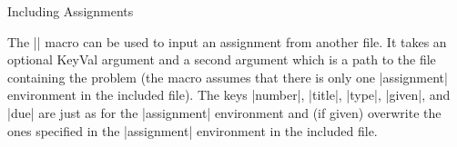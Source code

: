 \begin{sfragment}{Including Assignments}

The || macro can be used to input
an assignment from another file. It takes an optional KeyVal argument and a second
argument which is a path to the file containing the problem (the macro assumes that
there is only one |assignment| environment in the included file).  The keys
|number|, |title|,
|type|, |given|, and |due|
are just as for the |assignment| environment and (if given) overwrite the ones specified
in the |assignment| environment in the included file.
\end{sfragment}

